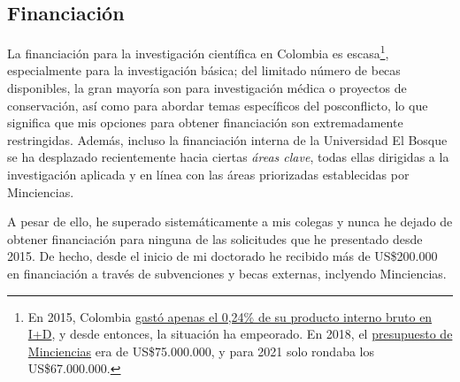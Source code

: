 \documentclass[11pt,a4paper,]{awesome-cv}
\begin{document}
\hypertarget{financiaciuxf3n}{%
\subsection{Financiación}\label{financiaciuxf3n}}

\begin{footnotesize}
La financiación para la investigación científica en Colombia es escasa\footnote{En 2015, Colombia \href{https://www.science.org/content/article/researchers-thought-peace-colombia-would-mean-more-science-funding-they-were-wrong}{gastó apenas el 0,24\% de su producto interno bruto en I+D}, y desde entonces, la situación ha empeorado. En 2018, el \href{https://www-infobae-com.translate.goog/america/colombia/2021/09/03/congresistas-piden-incrementar-el-presupuesto-de-minciencia-para-2022/?_x_tr_sl=es&_x_tr_tl=en}{presupuesto de Minciencias} era de US\$75.000.000, y para 2021 solo rondaba los US\$67.000.000.}, especialmente para la investigación básica; del limitado número de becas disponibles, la gran mayoría son para investigación médica o proyectos de conservación, así como para abordar temas específicos del posconflicto, lo que significa que mis opciones para obtener financiación son extremadamente restringidas. Además, incluso la financiación interna de la Universidad El Bosque se ha desplazado recientemente hacia ciertas \textit{áreas clave}, todas ellas dirigidas a la investigación aplicada y en línea con las áreas priorizadas establecidas por Minciencias.

A pesar de ello, he superado sistemáticamente a mis colegas y nunca he dejado de obtener financiación para ninguna de las solicitudes que he presentado desde 2015. De hecho, desde el inicio de mi doctorado he recibido más de US\$200.000 en financiación a través de subvenciones y becas externas, inclyendo Minciencias.
\end{footnotesize}
\end{document}
